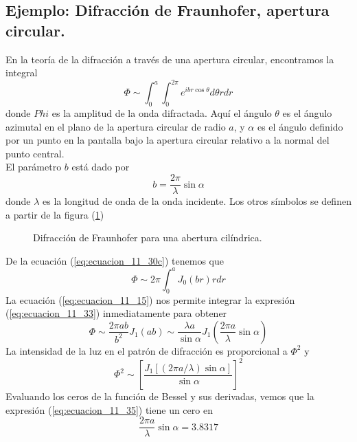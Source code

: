 \subsection{Ejemplo: Difracción de Fraunhofer, apertura circular.}
En la teoría de la difracción a través de una apertura circular, encontramos la integral
\begin{equation}
\Phi \sim \int_{0}^{a} \int_{0}^{2 \pi} e^{ibr \cos \theta} d \theta r dr
\label{eq:ecuacion_11_31}
\end{equation}
donde $Phi$ es la amplitud de la onda difractada. Aquí el ángulo $\theta$ es el ángulo azimutal en el plano de la apertura circular de radio $a$, y $\alpha$ es el ángulo definido por un punto en la pantalla bajo la apertura circular relativo a la normal del punto central.
\\
El parámetro $b$ está dado por
\begin{equation}
b = \dfrac{2 \pi}{\lambda} \sin \alpha
\label{eq:ecuacion_11_32}
\end{equation}
donde $\lambda$ es la longitud de onda de la onda incidente. Los otros símbolos se definen a partir de la figura (\ref{fig:difraccion_fraunhofer})
\begin{figure}[H]
\centering

\caption{Difracción de Fraunhofer para una abertura cilíndrica.}
\label{fig:difraccion_fraunhofer}
\end{figure}
De la ecuación (\ref{eq:ecuacion_11_30c}) tenemos que
\begin{equation}
\Phi \sim 2 \pi \int_{0}^{a} J_{0} (br) r dr 
\label{eq:ecuacion_11_33}
\end{equation}
La ecuación (\ref{eq:ecuacion_11_15}) nos permite integrar la expresión (\ref{eq:ecuacion_11_33}) inmediatamente para obtener
\begin{equation}
\Phi \sim \dfrac{2 \pi a b}{b^{2}} J_{1} (ab) \sim \dfrac{\lambda a}{\sin \alpha} J_{1} \left( \dfrac{2 \pi a}{\lambda} \sin \alpha \right)
\label{eq:ecuacion_11_34}
\end{equation}
La intensidad de la luz en el patrón de difracción es proporcional a $\Phi^{2}$ y
\begin{equation}
\Phi^{2} \sim \left[ \dfrac{J_{1} [(2 \pi a / \lambda) \sin \alpha]}{\sin \alpha} \right]^{2}
\label{eq:ecuacion_11_35}
\end{equation}
Evaluando los ceros de la función de Bessel y sus derivadas, vemos que la expresión (\ref{eq:ecuacion_11_35}) tiene un cero en
\begin{equation}
\dfrac{2 \pi a}{\lambda} \sin \alpha =  3.8317
\label{eq:ecuacion_11_36}
\end{equation}
